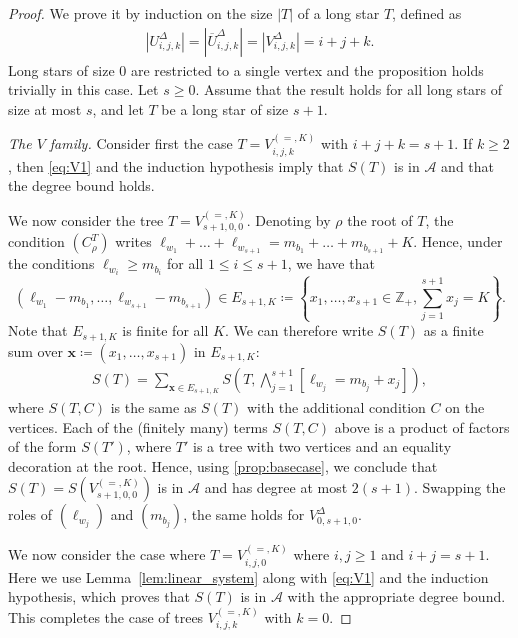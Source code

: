 \documentclass[12pt]{amsart}
\theoremstyle{plain}
\theoremstyle{remark}
\def\Z{\mathbb{Z}}
\def\cA{\mathcal{A}}
\begin{document}
\begin{proof}
We prove it by induction on the size $|T|$ of a long star $T$, defined as
\begin{align*}
\left|U^{\Delta}_{i,j,k}\right|=\left|\overline{U}^{\Delta}_{i,j,k}\right|=\left|V^{\Delta}_{i,j,k}\right|=i+j+k.
\end{align*}
Long stars of size $0$ are restricted to a single vertex and the proposition holds trivially in this case.
Let $s\ge 0$.
Assume that the result holds for all long stars of size at most $s$,
and let $T$ be a long star of size $s+1$.
\smallskip


\emph{The $V$ family.}
Consider first the case $T=V^{(=,K)}_{i,j,k}$ with $i+j+k=s+1$. If $k \geq 2$, then \eqref{eq:V1} and the induction hypothesis imply that $S(T)$ is in $\cA$
and that the degree bound holds.

We now consider the tree $T=V^{(=,K)}_{s+1,0,0}$.
Denoting by $\rho$ the root of $T$,
the condition $(C^T_\rho)$ writes $\ell_{w_1}+\ldots+\ell_{w_{s+1}} = m_{b_1}+\ldots+m_{b_{s+1}}+K$. Hence, under the conditions $\ell_{w_i} \geq m_{b_i}$ for all $1 \leq i \leq s+1$, we have that $$\left(\ell_{w_1}-m_{b_1}, \ldots, \ell_{w_{s+1}}-m_{b_{s+1}}\right) \in E_{s+1,K} \coloneqq  \left\{ x_1, \ldots, x_{s+1} \in \Z_+, \sum_{j=1}^{s+1} x_j = K \right\}.$$
Note that $E_{s+1,K}$ is finite for all $K$. We can therefore write $S(T)$ as a finite sum over $\mathbf{x} \coloneqq  (x_1, \ldots, x_{s+1})$ in $E_{s+1,K}$:
\begin{align*}
S(T) = \sum_{\mathbf{x} \in E_{s+1,K}} S\left(  T, \bigwedge_{j=1}^{s+1} \left[\ell_{w_j}=m_{b_j}+x_j\right]\right),  
\end{align*}
where $S(T,C)$ is the same as $S(T)$ with the additional condition $C$ on the
vertices. Each of the (finitely many) terms $S(T,C)$ above 
is a product of factors of the form $S(T')$, where $T'$ is a tree with two vertices and an equality decoration at the root.
Hence, using \cref{prop:basecase}, we conclude that $S(T)=S(V^{(=,K)}_{s+1,0,0})$ is in $\cA$ and has degree at most $2(s+1)$.
Swapping the roles of $(\ell_{w_j})$ and $(m_{b_j})$, the same
holds for $V^{\Delta}_{0,s+1,0}$.

We now consider the case where $T=V^{(=,K)}_{i,j,0}$ where $i,j \geq 1$ and $i+j=s+1$. Here we use  Lemma~\ref{lem:linear_system} along with \eqref{eq:V1}
and the induction hypothesis, which proves that $S(T)$ is in $\cA$
with the appropriate degree bound.
This completes the case of trees $V^{(=,K)}_{i,j,k}$ with $k=0$.


\end{proof}
\end{document}
